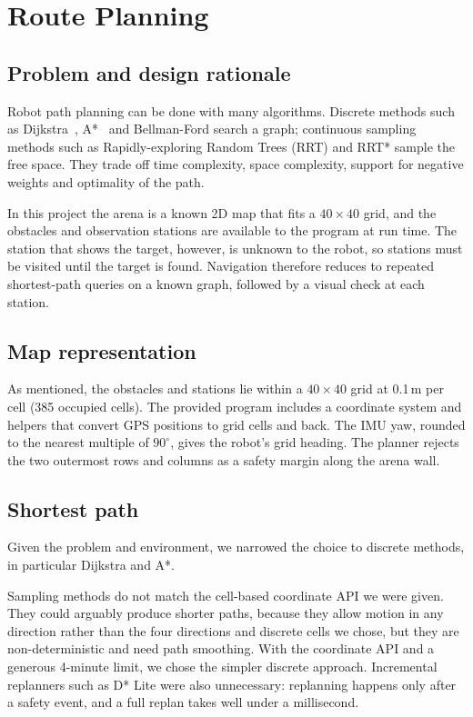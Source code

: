\section{Route Planning}
\label{sec:planning}

\subsection{Problem and design rationale}
Robot path planning can be done with many algorithms. Discrete methods such as Dijkstra~\cite{dijkstra1959note}, A*~\cite{hart1968astar} and Bellman-Ford search a graph; continuous sampling methods such as Rapidly-exploring Random Trees (RRT) and RRT* sample the free space. They trade off time complexity, space complexity, support for negative weights and optimality of the path.

In this project the arena is a known 2D map that fits a $40\times40$ grid, and the obstacles and observation stations are available to the program at run time. The station that shows the target, however, is unknown to the robot, so stations must be visited until the target is found. Navigation therefore reduces to repeated shortest-path queries on a known graph, followed by a visual check at each station.

\subsection{Map representation}
As mentioned, the obstacles and stations lie within a $40\times40$ grid at 0.1\,m per cell (385 occupied cells). The provided program includes a coordinate system and helpers that convert GPS positions to grid cells and back. The IMU yaw, rounded to the nearest multiple of $90^\circ$, gives the robot's grid heading. The planner rejects the two outermost rows and columns as a safety margin along the arena wall.

\subsection{Shortest path}
Given the problem and environment, we narrowed the choice to discrete methods, in particular Dijkstra and A*.

 Sampling methods do not match the cell-based coordinate API we were given. They could arguably produce shorter paths, because they allow motion in any direction rather than the four directions and discrete cells we chose, but they are non-deterministic and need path smoothing. With the coordinate API and a generous 4-minute limit, we chose the simpler discrete approach. Incremental replanners such as D* Lite were also unnecessary: replanning happens only after a safety event, and a full replan takes well under a millisecond.

